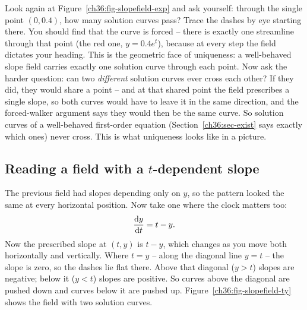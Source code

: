 \begin{walkbox}
Look again at Figure~\ref{ch36:fig-slopefield-exp} and ask yourself: through the single point $(0, 0.4)$, how many solution curves pass? Trace the dashes by eye starting there. You should find that the curve is forced -- there is exactly one streamline through that point (the red one, $y=0.4e^t$), because at every step the field dictates your heading. This is the geometric face of uniqueness: a well-behaved slope field carries exactly one solution curve through each point. Now ask the harder question: can two \emph{different} solution curves ever cross each other? If they did, they would share a point -- and at that shared point the field prescribes a single slope, so both curves would have to leave it in the same direction, and the forced-walker argument says they would then be the same curve. So solution curves of a well-behaved first-order equation (Section~\ref{ch36:sec-exist} says exactly which ones) never cross. This is what uniqueness looks like in a picture.
\end{walkbox}

\subsection{Reading a field with a \texorpdfstring{$t$}{t}-dependent slope}

The previous field had slopes depending only on $y$, so the pattern looked the same at every horizontal position. Now take one where the clock matters too:
\[
  \frac{\mathrm{d} y}{\mathrm{d} t} = t - y.
\]
Now the prescribed slope at $(t,y)$ is $t - y$, which changes as you move both horizontally and vertically. Where $t = y$ -- along the diagonal line $y=t$ -- the slope is zero, so the dashes lie flat there. Above that diagonal ($y > t$) slopes are negative; below it ($y<t$) slopes are positive. So curves above the diagonal are pushed down and curves below it are pushed up. Figure~\ref{ch36:fig-slopefield-ty} shows the field with two solution curves.

